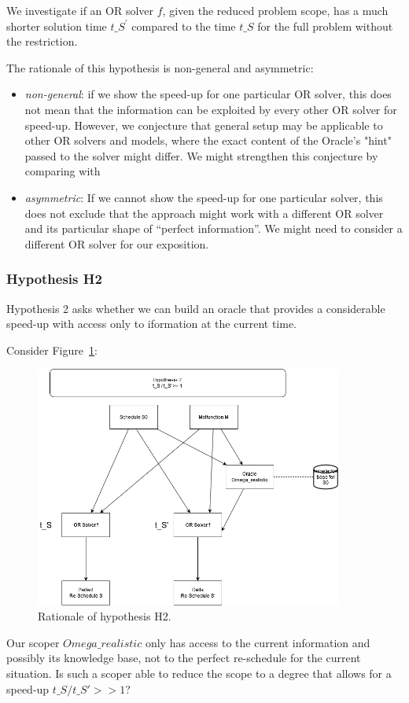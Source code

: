 \documentclass{article}
\begin{document}
We investigate if an OR solver $f$, given the reduced problem scope, has a much shorter solution time $t\_{S^\prime}$  compared to the time $t\_S$ for the full problem without the restriction.

The rationale of this hypothesis is non-general and asymmetric:
%
\begin{itemize}
    \item
    \emph{non-general}: if we show the speed-up for one particular OR solver, this does not mean that the information can be exploited by every other OR solver for speed-up. However, we conjecture that general setup may be applicable to other OR solvers and models, where the exact content of the Oracle's "hint" passed to the solver might differ. We might strengthen this conjecture by comparing with
\item
    \emph{asymmetric}: If we cannot show the speed-up for one particular solver, this does not exclude that the approach might work with a different OR solver and its particular shape of ``perfect information''. We might need to consider a different OR solver for our exposition.
\end{itemize}



\subsubsection{Hypothesis H2}\label{subec:H2}
Hypothesis 2 asks whether we can build an oracle that provides a considerable speed-up with access only to iformation at the current time.

Consider Figure~\ref{fig:introduction_H2}:
%
\begin{figure}[hbtp]
	\centering
  \includegraphics[width=0.9\textwidth]{introduction_H2.png}
	\caption{Rationale of hypothesis H2.}
	\label{fig:introduction_H2}
\end{figure}
%
Our scoper $Omega\_realistic$ only has access to the current information and possibly its knowledge base, not to the perfect re-schedule for the current situation. Is such a scoper able to reduce the scope to a degree that allows for a speed-up $t\_S / t\_S' >> 1$?
\end{document}
